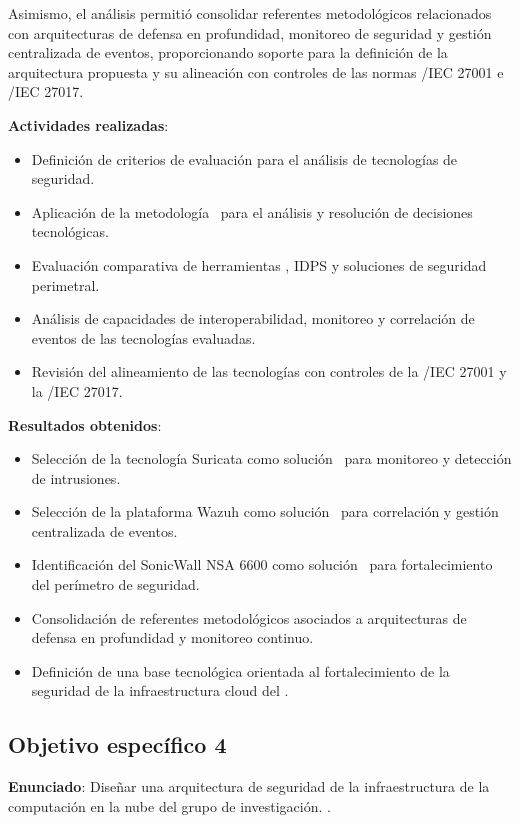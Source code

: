 Asimismo, el análisis permitió consolidar referentes metodológicos relacionados con arquitecturas de defensa en profundidad, monitoreo de 
seguridad y gestión centralizada de eventos, proporcionando soporte para la definición de la arquitectura propuesta y su alineación con 
controles de las normas \ISO/IEC 27001 e \ISO/IEC 27017.

\textbf{Actividades realizadas}:
\begin{itemize}
    \item Definición de criterios de evaluación para el análisis de tecnologías de seguridad.
	\item Aplicación de la metodología \DAR\ para el análisis y resolución de decisiones tecnológicas.
	\item Evaluación comparativa de herramientas \SIEM, IDPS y soluciones de seguridad perimetral.
	\item Análisis de capacidades de interoperabilidad, monitoreo y correlación de eventos de las tecnologías evaluadas.
	\item Revisión del alineamiento de las tecnologías con controles de la \ISO/IEC 27001 y la \ISO/IEC 27017.
\end{itemize}

\textbf{Resultados obtenidos}:
\begin{itemize}
    \item Selección de la tecnología Suricata como solución \IDPS\ para monitoreo y detección de intrusiones.
	\item Selección de la plataforma Wazuh como solución \SIEM\ para correlación y gestión centralizada de eventos.
	\item Identificación del SonicWall NSA 6600 como solución \UTM\ para fortalecimiento del perímetro de seguridad.
	\item Consolidación de referentes metodológicos asociados a arquitecturas de defensa en profundidad y monitoreo continuo.
	\item Definición de una base tecnológica orientada al fortalecimiento de la seguridad de la infraestructura cloud del \GRID.
\end{itemize}

\subsection{Objetivo específico 4}
\noindent

\textbf{Enunciado}: Diseñar una arquitectura de seguridad de la infraestructura de la computación en la nube del grupo de investigación. 
\GRID.

